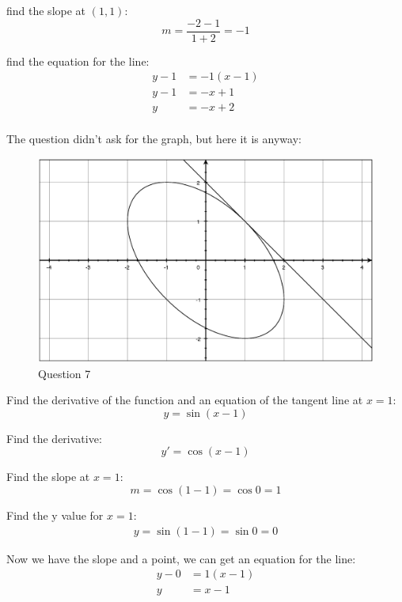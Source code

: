 \documentclass[fleqn,addpoints]{exam}
\begin{document}
\begin{questions}
\begin{solution}
find the slope at $(1, 1)$:
\[
  m = \frac{-2 -1}{1 + 2} = -1
\]

find the equation for the line:
\begin{align*}
  y - 1 &= -1(x - 1) \\
  y - 1 &= -x + 1 \\
  y &= -x + 2 \\
\end{align*}

The question didn't ask for the graph, but here it is anyway:
\begin{figure}[H]
  \centering
  \includegraphics[scale=.3]{final_7_q7.eps}
  \caption*{Question 7}
\end{figure}
\end{solution}

\question Find the derivative of the function and an equation of the tangent line at $x = 1$:
\[
  y = \sin(x - 1)
\]

\begin{solution}
Find the derivative:
\[
  y' = \cos(x - 1)
\]

Find the slope at $x = 1$:
\[
  m = \cos(1 - 1) = \cos 0 = 1
\]

Find the y value for $x = 1$:
\begin{align*}
  y = \sin(1 - 1) = \sin 0 = 0
\end{align*}

Now we have the slope and a point, we can get an equation for the line:
\begin{align*}
  y - 0 &= 1(x - 1) \\
  y &= x - 1 \\
\end{align*}


\end{solution}
\end{questions}
\end{document}
